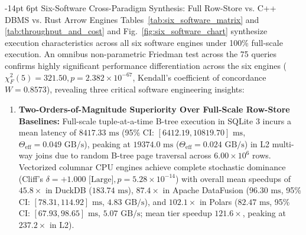 \documentclass[10pt,a4paper]{article}
\makeatletter
\renewcommand\subsection{\@startsection{subsection}{2}{\z@}%
  {-14pt \@plus -3pt \@minus -1.5pt}%
  {6pt \@plus 1.5pt}%
  {\normalfont\normalsize\bfseries}}
\makeatother
\begin{document}
\subsection{Six-Software Cross-Paradigm Synthesis: Full Row-Store vs. C++ DBMS vs. Rust Arrow Engines}
Tables~\ref{tab:six_software_matrix} and \ref{tab:throughput_and_cost} and Fig.~\ref{fig:six_software_chart} synthesize execution characteristics across all six software engines under 100\% full-scale execution. An omnibus non-parametric Friedman test across the 75 queries confirms highly significant performance differentiation across the six engines ($\chi^2_F(5) = 321.50, p = 2.382 \times 10^{-67}$, Kendall's coefficient of concordance $W = 0.8573$), revealing three critical software engineering insights:
\begin{enumerate}[leftmargin=1.5em,itemsep=2pt]
    \item \textbf{Two-Orders-of-Magnitude Superiority Over Full-Scale Row-Store Baselines:} Full-scale tuple-at-a-time B-tree execution in SQLite 3 incurs a mean latency of $8417.33\text{ ms}$ (95\% CI: $[6412.19, 10819.70]\text{ ms}$, $\Theta_{\text{eff}} = 0.049\text{ GB/s}$), peaking at $19374.0\text{ ms}$ ($\Theta_{\text{eff}} = 0.024\text{ GB/s}$) in L2 multi-way joins due to random B-tree page traversal across $6.00\times 10^6$ rows. Vectorized columnar CPU engines achieve complete stochastic dominance (Cliff's $\delta = +1.000\text{ [Large]}, p = 5.28 \times 10^{-14}$) with overall mean speedups of $45.8\times$ in DuckDB ($183.74\text{ ms}$), $87.4\times$ in Apache DataFusion ($96.30\text{ ms}$, 95\% CI: $[78.31, 114.92]\text{ ms}$, $4.83\text{ GB/s}$), and $102.1\times$ in Polars ($82.47\text{ ms}$, 95\% CI: $[67.93, 98.65]\text{ ms}$, $5.07\text{ GB/s}$; mean tier speedup $121.6\times$, peaking at $237.2\times$ in L2).

\end{enumerate}
\end{document}

